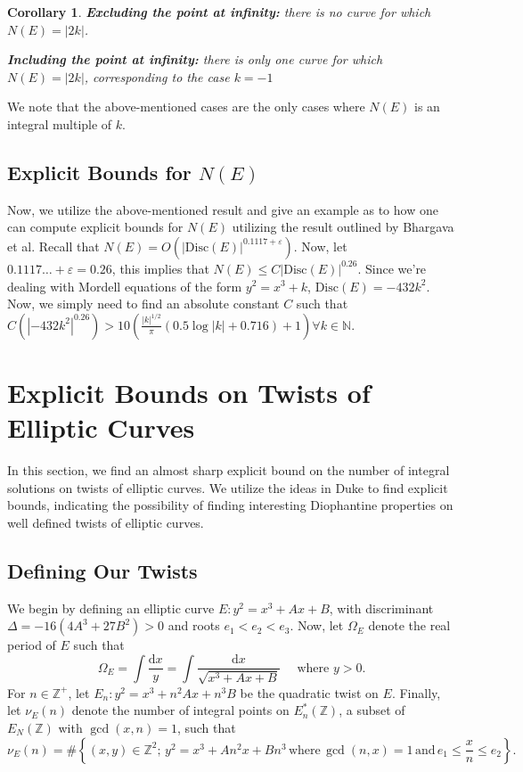 \documentclass[12pt]{amsart}
\theoremstyle{plain}
\newtheorem{cor}[thm]{Corollary}
\theoremstyle{definition}
\theoremstyle{remark}
\numberwithin{equation}{section}
\numberwithin{thm}{section}
\theoremstyle{named}
\theoremstyle{named}
\begin{document}
\begin{cor}
   \item \textbf{{Excluding the point at infinity:}} there is  no curve for which $N(E) = |2k|$. 
    \item \textbf{{Including the point at infinity:}} there is only one curve for which $N(E) = |2k|$, corresponding to the case $k = -1$
\end{cor}
We note that the above-mentioned cases are the only cases where $N(E)$ is an integral multiple of $k$.
\subsection{Explicit Bounds for $N(E)$}
Now, we utilize the above-mentioned result and give an example as to how one can compute explicit bounds for $N(E)$ utilizing the result outlined by {Bhargava et al.} Recall that $N(E) = O \left(|\mathrm{Disc}(E)|^{0.1117 + \varepsilon} \right).$ Now, let $0.1117 \ldots + \varepsilon = 0.26$, this implies that $N(E) \le C|\mathrm{Disc}(E)|^{0.26}$. Since we're dealing with Mordell equations of the form $y^2 = x^3 + k$, $\mathrm{Disc}(E) = -432k^2$. Now, we simply need to find  an absolute constant $C$ such that $C(|-432k^2|^{0.26}) > 10 \left( \frac{|k|^{1/2}}{\pi}(0.5 \log |k| +0.716) + 1\right) \forall k \in \mathbb N.$
\section{Explicit Bounds on Twists of Elliptic Curves}
In this section, we find an almost sharp explicit bound on the number of integral solutions on twists of elliptic curves. We utilize the ideas in {Duke} \cite{10.1093/imrn/rnab249} to find explicit bounds, indicating the possibility of finding interesting Diophantine properties on well defined twists of elliptic curves. 
\subsection{Defining Our Twists}
We begin by defining an elliptic curve $E: y^2 = x^3 + Ax + B$, with discriminant $\Delta = -16(4A^3 + 27B^2) > 0$ and roots $e_1 < e_2 < e_3.$ Now, let $\Omega_E$ denote the real period of $E$ such that $$ \Omega_E = \int \frac{\mathrm{d}x}{y} = \int \frac{\mathrm{d}x}{\sqrt{x^3 + Ax + B}} \quad \text{ where }y > 0.$$ For $n \in \mathbb{Z}^{+}$, let $E_n: y^2 = x^3 + n^2Ax + n^3B$ be the quadratic twist on $E.$ Finally, let $\nu_{E}(n)$ denote the number of integral points on $E_{n}^{*} (\mathbb{Z})$, a subset of $E_{N}( \mathbb{Z})$ with $\gcd(x, n) = 1$, such that  $$ 
\nu_E(n) = \# \left\{ (x, y) \in \mathbb{Z}^2 ; \, y^2 = x^3 + An^2 x + Bn^3 \, \text{where} \, \gcd(n, x) = 1 \, \text{and} \, e_1 \leq \frac{x}{n} \leq e_2 \right\}.
$$
\end{document}
